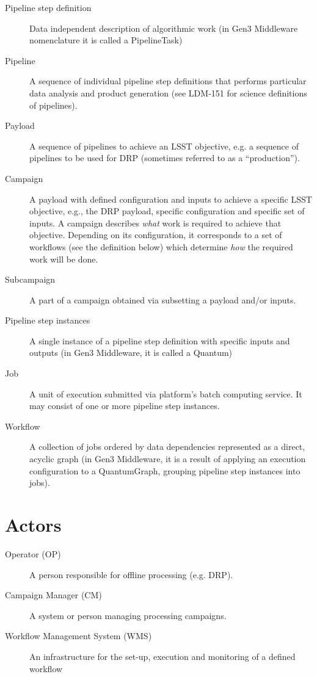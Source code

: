 \documentclass[DM,toc]{lsstdoc}
\begin{document}
\begin{description}
  \item[Pipeline step definition]
    Data independent description of algorithmic work (in Gen3 Middleware
    nomenclature it is called a PipelineTask)
  \item[Pipeline] 
    A sequence of individual pipeline step definitions that performs particular
    data analysis and product generation (see LDM-151 for science definitions
    of pipelines).
  \item[Payload]
    A sequence of pipelines to achieve an LSST objective, e.g. a sequence of
    pipelines to be used for DRP (sometimes referred to as a ``production'').
  \item[Campaign]
    A payload with defined configuration and inputs to achieve a
    specific LSST objective, e.g., the DRP payload, specific
    configuration and specific set of inputs. A campaign describes
    \emph{what} work is required to achieve that objective.  Depending on
    its configuration, it corresponds to a set of workflows (see the
    definition below) which determine \emph{how} the required work will be
    done.
  \item[Subcampaign]
    A part of a campaign obtained via subsetting a payload and/or inputs.
  \item[Pipeline step instances]
    A single instance of a pipeline step definition with specific inputs and
    outputs (in Gen3 Middleware, it is called a Quantum)
  \item[Job]
    A unit of execution submitted via platform's batch computing
    service. It may consist of one or more pipeline step instances.
  \item[Workflow]
    A collection of jobs ordered by data dependencies represented as a direct,
    acyclic graph (in Gen3 Middleware, it is a result of applying an execution
    configuration to a QuantumGraph, grouping pipeline step instances into
    jobs).
\end{description}

\section{Actors}

\begin{description}
  \item[Operator (OP)]
    A person responsible for offline processing (e.g. DRP). 
  \item[Campaign Manager (CM)]
    A system or person managing processing campaigns.
  \item[Workflow Management System (WMS)]
    An infrastructure for the set-up, execution and monitoring of a defined
    workflow
\end{description}
\end{document}
